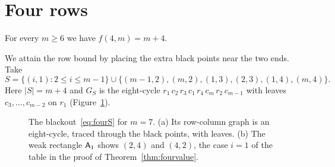 \section{Four rows}\label{sec:four}

\begin{theorem}\label{thm:fourvalue}
For every $m\ge6$ we have $f(4,m)=m+4$.
\end{theorem}

We attain the row bound by placing the extra black points near the two ends.
Take
\begin{equation}\label{eq:fourS}
S=\{(i,1):2\le i\le m-1\}\cup\{(m-1,2),(m,2),(1,3),(2,3),(1,4),(m,4)\}.
\end{equation}
Here $|S|=m+4$ and $G_S$ is the eight-cycle $r_1\,c_2\,r_3\,c_1\,r_4\,c_m\,r_2\,c_{m-1}$ with leaves $c_3,\ldots,c_{m-2}$ on $r_1$ (Figure~\ref{fig:four}).

\begin{figure}[t]
\centering

\caption{The blackout~\eqref{eq:fourS} for $m=7$. (a) Its row-column graph is an eight-cycle, traced through the black points, with leaves. (b) The weak rectangle $\mathsf{A}_1$ shows $(2,4)$ and $(4,2)$, the case $i=1$ of the table in the proof of Theorem~\ref{thm:fourvalue}.}
\label{fig:four}
\end{figure}

